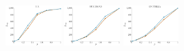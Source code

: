 \documentclass[a4paper]{report}
\newcommand{\wratio}{0.16}
\begin{document}
\includegraphics[width=\wratio\textwidth]{influence/E_R/fs_e_r}\hfill
\includegraphics[width=\wratio\textwidth]{influence/EUROROAD/fs_euroroad}\hfill
\includegraphics[width=\wratio\textwidth]{influence/GNUTELLA/fs_gnutella}\hfill
\end{document}
